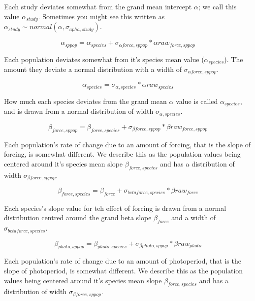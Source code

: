 \documentclass[11pt,letter]{article}
\begin{document}
Each study deviates somewhat from the grand mean intercept $\alpha$; we call this value $\alpha_{study}$. Sometimes you might see this written as  $\alpha_{study} \sim normal(\alpha, \sigma_{apha,study})$. 

\begin{equation}
\alpha_{sppop} = \alpha_{species}  + \sigma_{\alpha force,sppop} * \alpha raw_{force,sppop}
\end{equation}

Each population deviates somewhat from it's species mean value ($\alpha_{species}$). The amount they deviate a normal distribution with a width of $\sigma_{\alpha force,sppop}$. 

\begin{equation}
\alpha_{species} = \sigma_{\alpha, species} * \alpha raw_{species}
\end{equation}

How much each species deviates from the grand mean $\alpha$ value is called $\alpha_{species} $, and is drawn from a normal distribution of width $\sigma_{\alpha, species} $. 

\begin{equation}
\beta _{force,sppop} = \beta _{force, species} + \sigma_{\beta force,sppop} * \beta raw_{force,sppop}
\end{equation}

Each population's rate of change due to an amount of forcing, that is the slope of forcing, is somewhat different. We describe this as the population values being centered around it's species mean slope $ \beta _{force, species}$ and has a distribution of width $\sigma_{\beta force,sppop} $. 

\begin{equation}
\beta _{force,species} = \beta_{force} + \sigma_{beta force, species} * \beta raw_{force}
\end{equation}

Each species's slope value for teh effect of forcing is drawn from a normal distribution centred around the grand beta slope $\beta_{force}$ and a width of $\sigma_{beta force, species}$.

\begin{equation}
\beta _{photo,sppop} = \beta_{photo,species} + \sigma_{\beta photo,sppop} * \beta raw_{photo}
\end{equation}

Each population's rate of change due to an amount of photoperiod, that is the slope of photoperiod, is somewhat different. We describe this as the population values being centered around it's species mean slope $ \beta _{force, species}$ and has a distribution of width $\sigma_{\beta force,sppop} $. 
\end{document}
